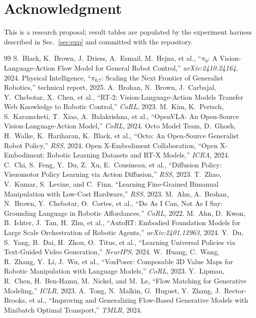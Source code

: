 \documentclass[conference,10pt]{IEEEtran}
\begin{document}
\section*{Acknowledgment}
This is a research proposal; result tables are populated by the experiment harness described in Sec.~\ref{sec:exp} and committed with the repository.

\begin{thebibliography}{99}
 S.~Black, K.~Brown, J.~Driess, A.~Esmail, M.~Hejna, et al., ``$\pi_0$: A Vision-Language-Action Flow Model for General Robot Control,'' \emph{arXiv:2410.24164}, 2024.
 Physical Intelligence, ``$\pi_0.7$: Scaling the Next Frontier of Generalist Robotics,'' technical report, 2025.
 A.~Brohan, N.~Brown, J.~Carbajal, Y.~Chebotar, X.~Chen, et al., ``RT-2: Vision-Language-Action Models Transfer Web Knowledge to Robotic Control,'' \emph{CoRL}, 2023.
 M.~Kim, K.~Pertsch, S.~Karamcheti, T.~Xiao, A.~Balakrishna, et al., ``OpenVLA: An Open-Source Vision-Language-Action Model,'' \emph{CoRL}, 2024.
 Octo Model Team, D.~Ghosh, H.~Walke, K.~Hariharan, K.~Black, et al., ``Octo: An Open-Source Generalist Robot Policy,'' \emph{RSS}, 2024.
 Open X-Embodiment Collaboration, ``Open X-Embodiment: Robotic Learning Datasets and RT-X Models,'' \emph{ICRA}, 2024.
 C.~Chi, S.~Feng, Y.~Du, Z.~Xu, E.~Cousineau, et al., ``Diffusion Policy: Visuomotor Policy Learning via Action Diffusion,'' \emph{RSS}, 2023.
 T.~Zhao, V.~Kumar, S.~Levine, and C.~Finn, ``Learning Fine-Grained Bimanual Manipulation with Low-Cost Hardware,'' \emph{RSS}, 2023.
 M.~Ahn, A.~Brohan, N.~Brown, Y.~Chebotar, O.~Cortes, et al., ``Do As I Can, Not As I Say: Grounding Language in Robotic Affordances,'' \emph{CoRL}, 2022.
 M.~Ahn, D.~Kwon, B.~Ichter, J.~Tan, H.~Zhu, et al., ``AutoRT: Embodied Foundation Models for Large Scale Orchestration of Robotic Agents,'' \emph{arXiv:2401.12963}, 2024.
 Y.~Du, S.~Yang, B.~Dai, H.~Zhou, O.~Titus, et al., ``Learning Universal Policies via Text-Guided Video Generation,'' \emph{NeurIPS}, 2024.
 W.~Huang, C.~Wang, R.~Zhang, Y.~Li, J.~Wu, et al., ``VoxPoser: Composable 3D Value Maps for Robotic Manipulation with Language Models,'' \emph{CoRL}, 2023.
 Y.~Lipman, R.~Chen, H.~Ben-Hamu, M.~Nickel, and M.~Le, ``Flow Matching for Generative Modeling,'' \emph{ICLR}, 2023.
 A.~Tong, N.~Malkin, G.~Huguet, Y.~Zhang, J.~Rector-Brooks, et al., ``Improving and Generalizing Flow-Based Generative Models with Minibatch Optimal Transport,'' \emph{TMLR}, 2024.

\end{thebibliography}
\end{document}
